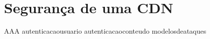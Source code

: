 \section{Seguran\c{c}a de uma CDN} \label{sec:seguranca}

{AAA}
{autenticacaousuario}
{autenticacaoconteudo}
{modelosdeataques}